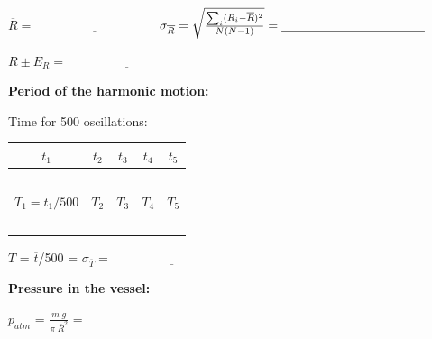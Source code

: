 \documentclass{article}
\begin{document}
\vspace{4mm}

$\overline{R}=\underline{\hspace{4cm}}$
\hspace{1cm}
$\sigma_{\overline{R}}=
\sqrt{\sum_i(R_i-\overline{R})^2\over N(N-1)}=\underline{\hspace{4cm}}$  
\vspace{4mm}

$R\pm E_R = \underline{\hspace{4cm}}$

\vspace{6mm}

\bf{Period of the harmonic motion:}

\vspace{5mm}

Time for 500 oscillations:

\vspace{2mm}

\begin{tabular}{|c|c|c|c|c|}
\hline
$t_1$&$t_2$&$t_3$&$t_4$&$t_5$\\
\hline
~\hspace{3cm}~&~\hspace{3cm}~&~\hspace{3cm}~&\hspace{3cm}~&~\hspace{3cm}~\\
\hline
$T_1=t_1/500$&$T_2$&$T_3$&$T_4$&$T_5$\\
\hline
~\hspace{3cm}~&~\hspace{3cm}~&~\hspace{3cm}~&\hspace{3cm}~&~\hspace{3cm}~\\
\hline
\end{tabular}

\vspace{4mm}

$\overline{T}$ = $\overline{t}$/500 = \underline{\hspace{4cm}}
\hspace{1cm}
$\sigma_{\overline{T}}=\underline{\hspace{4cm}}$
\vspace{5mm}


\textbf{Pressure in the vessel:}

\vspace{5mm}

$p_{atm}$ = \underline{\hspace{4cm}} \hspace{1cm} $\frac{m
\; g}{\pi \; \overline{R}^2}$ = \underline{\hspace{4cm}}
\end{document}
